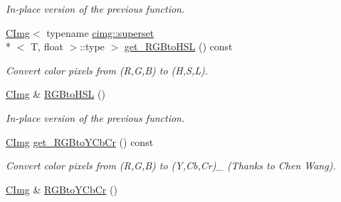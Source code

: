 \begin{DoxyCompactItemize}
\begin{DoxyCompactList}\small\item\em In-\/place version of the previous function. \end{DoxyCompactList}\item 
\hypertarget{structcimg__library_1_1_c_img_ad90ba344b88257b5c954e15140f43184}{\hyperlink{structcimg__library_1_1_c_img}{C\-Img}$<$ typename \hyperlink{structcimg__library_1_1cimg_1_1superset}{cimg\-::superset}\\*
$<$ T, float $>$\-::type $>$ \hyperlink{structcimg__library_1_1_c_img_ad90ba344b88257b5c954e15140f43184}{get\-\_\-\-R\-G\-Bto\-H\-S\-L} () const }\label{structcimg__library_1_1_c_img_ad90ba344b88257b5c954e15140f43184}

\begin{DoxyCompactList}\small\item\em Convert color pixels from (R,G,B) to (H,S,L). \end{DoxyCompactList}\item 
\hypertarget{structcimg__library_1_1_c_img_a571ec8a78ede523e337bf2e1936f5c11}{\hyperlink{structcimg__library_1_1_c_img}{C\-Img} \& \hyperlink{structcimg__library_1_1_c_img_a571ec8a78ede523e337bf2e1936f5c11}{R\-G\-Bto\-H\-S\-L} ()}\label{structcimg__library_1_1_c_img_a571ec8a78ede523e337bf2e1936f5c11}

\begin{DoxyCompactList}\small\item\em In-\/place version of the previous function. \end{DoxyCompactList}\item 
\hypertarget{structcimg__library_1_1_c_img_a0e8c064bbeadbd25d9924a8e594b890f}{\hyperlink{structcimg__library_1_1_c_img}{C\-Img} \hyperlink{structcimg__library_1_1_c_img_a0e8c064bbeadbd25d9924a8e594b890f}{get\-\_\-\-R\-G\-Bto\-Y\-Cb\-Cr} () const }\label{structcimg__library_1_1_c_img_a0e8c064bbeadbd25d9924a8e594b890f}

\begin{DoxyCompactList}\small\item\em Convert color pixels from (R,G,B) to (Y,Cb,Cr)\-\_ (Thanks to Chen Wang). \end{DoxyCompactList}\item 
\hypertarget{structcimg__library_1_1_c_img_a40bf7f55f1a92f74d51db3b6c8b53e51}{\hyperlink{structcimg__library_1_1_c_img}{C\-Img} \& \hyperlink{structcimg__library_1_1_c_img_a40bf7f55f1a92f74d51db3b6c8b53e51}{R\-G\-Bto\-Y\-Cb\-Cr} ()}\label{structcimg__library_1_1_c_img_a40bf7f55f1a92f74d51db3b6c8b53e51}


\end{DoxyCompactItemize}

